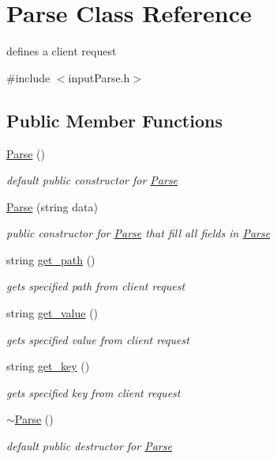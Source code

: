 \hypertarget{classParse}{}\section{Parse Class Reference}
\label{classParse}


defines a client request  




{\ttfamily \#include $<$input\+Parse.\+h$>$}

\subsection*{Public Member Functions}
\begin{DoxyCompactItemize}
\item 
\hyperlink{classParse_ab44bf754dbe7e6fc008af31af8ca75fb}{Parse} ()\hypertarget{classParse_ab44bf754dbe7e6fc008af31af8ca75fb}{}\label{classParse_ab44bf754dbe7e6fc008af31af8ca75fb}

\begin{DoxyCompactList}\small\item\em default public constructor for \hyperlink{classParse}{Parse} \end{DoxyCompactList}\item 
\hyperlink{classParse_aa65ad10fd2ac9eb15bf75d681e4b1d38}{Parse} (string data)
\begin{DoxyCompactList}\small\item\em public constructor for \hyperlink{classParse}{Parse} that fill all fields in \hyperlink{classParse}{Parse} \end{DoxyCompactList}\item 
string \hyperlink{classParse_afe93e93b4a3be37aa33ff811d490ea08}{get\+\_\+path} ()
\begin{DoxyCompactList}\small\item\em gets specified path from client request \end{DoxyCompactList}\item 
string \hyperlink{classParse_aaa75754008d716cf912eb0526e31ae8f}{get\+\_\+value} ()
\begin{DoxyCompactList}\small\item\em gets specified value from client request \end{DoxyCompactList}\item 
string \hyperlink{classParse_a1d8ede969d4c362b59ed7f9ff5943166}{get\+\_\+key} ()
\begin{DoxyCompactList}\small\item\em gets specified key from client request \end{DoxyCompactList}\item 
\hyperlink{classParse_a09620677a05691231960c07803aec495}{$\sim$\+Parse} ()\hypertarget{classParse_a09620677a05691231960c07803aec495}{}\label{classParse_a09620677a05691231960c07803aec495}

\begin{DoxyCompactList}\small\item\em default public destructor for \hyperlink{classParse}{Parse} \end{DoxyCompactList}\end{DoxyCompactItemize}


